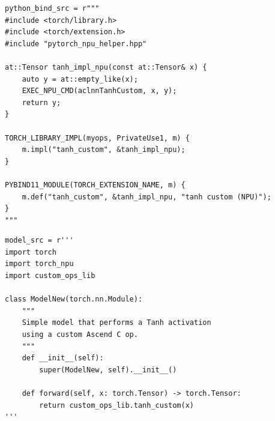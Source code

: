 \documentclass{article} %
\theoremstyle{definition}
\theoremstyle{remark}
\begin{document}
  \begin{tcolorbox}[colback=violet!5, colframe=violet!30, boxrule=0.3pt, arc=0pt, left=2pt, right=2pt, top=0pt, bottom=0pt, breakable, nobeforeafter]
  \begin{verbatim}
python_bind_src = r"""
#include <torch/library.h>
#include <torch/extension.h>
#include "pytorch_npu_helper.hpp"

at::Tensor tanh_impl_npu(const at::Tensor& x) {
    auto y = at::empty_like(x);
    EXEC_NPU_CMD(aclnnTanhCustom, x, y);
    return y;
}

TORCH_LIBRARY_IMPL(myops, PrivateUse1, m) {
    m.impl("tanh_custom", &tanh_impl_npu);
}

PYBIND11_MODULE(TORCH_EXTENSION_NAME, m) {
    m.def("tanh_custom", &tanh_impl_npu, "tanh custom (NPU)");
}
"""
  \end{verbatim}
  \end{tcolorbox}

  \begin{tcolorbox}[colback=cyan!5, colframe=cyan!30, boxrule=0.3pt, arc=0pt, left=2pt, right=2pt, top=0pt, bottom=1pt, breakable, nobeforeafter]
  \begin{verbatim}
model_src = r'''
import torch
import torch_npu
import custom_ops_lib

class ModelNew(torch.nn.Module):
    """
    Simple model that performs a Tanh activation 
    using a custom Ascend C op.
    """
    def __init__(self):
        super(ModelNew, self).__init__()

    def forward(self, x: torch.Tensor) -> torch.Tensor:
        return custom_ops_lib.tanh_custom(x)
'''
  \end{verbatim}
  \end{tcolorbox}

\end{document}
